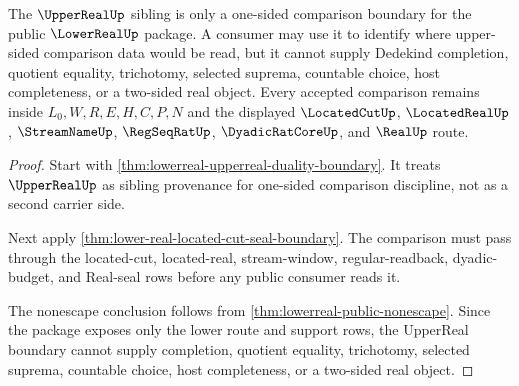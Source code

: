 \begin{theorem}
\label{thm:lower-real-upper-real-comparison-nonescape}
The $\UpperRealUp$ sibling is only a one-sided comparison boundary for the public $\LowerRealUp$ package. A consumer may use it to identify where upper-sided comparison data would be read, but it cannot supply Dedekind completion, quotient equality, trichotomy, selected suprema, countable choice, host completeness, or a two-sided real object. Every accepted comparison remains inside $L_0,W,R,E,H,C,P,N$ and the displayed $\LocatedCutUp$, $\LocatedRealUp$, $\StreamNameUp$, $\RegSeqRatUp$, $\DyadicRatCoreUp$, and $\RealUp$ route.
\end{theorem}
\begin{proof}
Start with \autoref{thm:lowerreal-upperreal-duality-boundary}. It treats $\UpperRealUp$ as sibling provenance for one-sided comparison discipline, not as a second carrier side.

Next apply \autoref{thm:lower-real-located-cut-seal-boundary}. The comparison must pass through the located-cut, located-real, stream-window, regular-readback, dyadic-budget, and Real-seal rows before any public consumer reads it.

The nonescape conclusion follows from \autoref{thm:lowerreal-public-nonescape}. Since the package exposes only the lower route and support rows, the UpperReal boundary cannot supply completion, quotient equality, trichotomy, selected suprema, countable choice, host completeness, or a two-sided real object.
\end{proof}

\begin{closurestatus}{\LowerRealUp}
  \theoryclosure{\matureClosure}
  \formalstatus{\unformalizedV}
\end{closurestatus}
